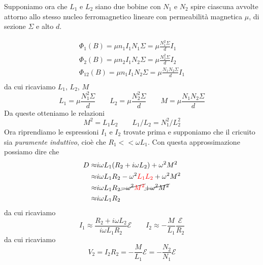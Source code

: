 \documentclass[x11names]{report}
\begin{document}
\noindent
Supponiamo ora che \(L_1\) e \(L_2\) siano due bobine con \(N_1\) e \(N_2\) spire ciascuna avvolte attorno allo stesso nucleo ferromagnetico lineare con permeabilità magnetica \(\mu\), di sezione \(\Sigma\) e alto \(d\).
\begin{figure}[H]
	\centering
\end{figure}
\begin{gather*}
	\Phi_1(B) = \mu n_1 I_1 N_1 \Sigma = \mu\frac{N_1^2\Sigma}{d} I_1\\ 
	\Phi_2(B) = \mu n_2 I_1 N_2 \Sigma = \mu\frac{N_2^2\Sigma}{d} I_2\\ 
	\Phi_{12}(B)= \mu n_1 I_1 N_2 \Sigma = \mu\frac{N_1N_2\Sigma}{d} I_1\\ 
\end{gather*}
da cui ricaviamo \(L_1\), \(L_2\), \(M\)
\[
L_1 = \mu\frac{N_1^2\Sigma}{d} \qquad L_2 = \mu\frac{N_2^2\Sigma}{d} \qquad M = \mu\frac{N_1N_2\Sigma}{d}
\]
Da queste otteniamo le relazioni
\[
\boxed{M^2 = L_1L_2} \qquad \boxed{L_1/L_2 = N_1^2/L_2^2}
\]
Ora riprendiamo le espressioni \(I_1\) e \(I_2\) trovate prima e supponiamo che il cricuito sia \textit{puramente induttivo}, cioè che \(R_1 << \omega L_1\). Con questa approssimazione possiamo dire che
\begin{align*}
	D \approx& i\omega L_1(R_2 +i \omega L_2) + \omega^2M^2 \\
	  \approx& i\omega L_1R_2 - \omega^2 \textcolor{red}{L_1L_2} + \omega^2M^2 \\
	  \approx& i\omega L_1R_2 \cancel{- \omega^2 \textcolor{red}{M^2}} \cancel{+ \omega^2M^2} \\
	  \approx& i\omega L_1R_2 
\end{align*}
da cui ricaviamo
\[
I_1 \approx \frac{R_2 + i\omega L_2}{i\omega L_1R_2}\mathcal{E} \qquad I_2 \approx -\frac{M}{L_1}\frac{\mathcal{E}}{R_2}
\]
da cui ricaviamo 
\[
V_2 = I_2R_2 = -\frac{M}{L_1}\mathcal{E} = -\frac{N_2}{N_1}\mathcal{E}
\]



\end{document}

